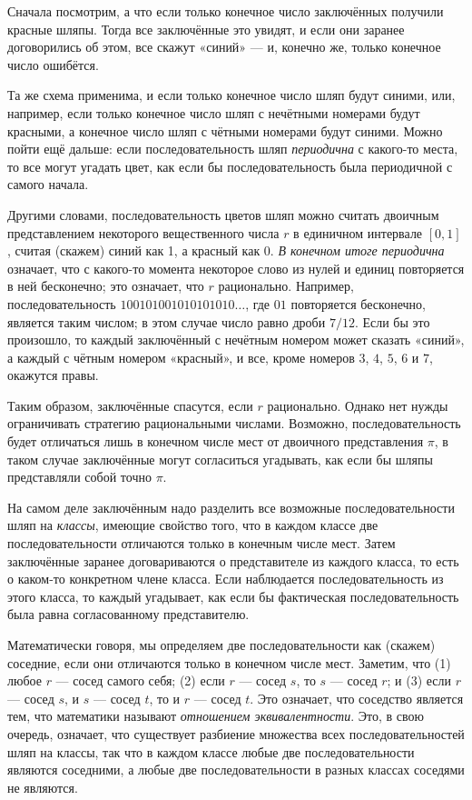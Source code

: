 Сначала посмотрим, а что если только конечное число заключённых получили красные шляпы.
Тогда все заключённые это увидят, и если они заранее договорились об этом, все скажут «синий» --- и, конечно же, только конечное число ошибётся.

Та же схема применима, и если только конечное число шляп будут синими, или, например, если только конечное число шляп с нечётными номерами будут красными, а конечное число шляп с чётными номерами будут синими.
Можно пойти ещё дальше: если последовательность шляп \emph{периодична} с какого-то места, то все могут угадать цвет, как если бы последовательность была периодичной с самого начала.

Другими словами, последовательность цветов шляп можно считать двоичным представлением некоторого вещественного числа $r$ в единичном интервале $[0,1]$, считая (скажем) синий как 1, а красный как 0.
\emph{В конечном итоге периодична} означает, что с какого-то момента некоторое слово из нулей и единиц повторяется в ней бесконечно;
это означает, что $r$ рационально.
Например, последовательность $100101001010101010\dots$, где $01$ повторяется бесконечно, является таким числом; в этом случае число равно дроби $7/12$.
Если бы это произошло, то каждый заключённый с нечётным номером может сказать «синий», а каждый с чётным номером «красный», и все, кроме номеров $3$, $4$, $5$, $6$ и $7$, окажутся правы.

Таким образом, заключённые спасутся, если $r$ рационально.
Однако нет нужды ограничивать стратегию рациональными числами.
Возможно, последовательность будет отличаться лишь в конечном числе мест от двоичного представления $\pi$, в таком случае заключённые могут согласиться угадывать, как если бы шляпы представляли собой точно $\pi$.

На самом деле заключённым надо разделить все возможные последовательности шляп на \emph{классы}, имеющие свойство того, что в каждом классе две последовательности отличаются только в конечным числе мест.
Затем заключённые заранее договариваются о представителе из каждого класса, то есть о каком-то конкретном члене класса.
Если наблюдается последовательность из этого класса, то каждый угадывает, как если бы фактическая последовательность была равна согласованному представителю.

Математически говоря, мы определяем две последовательности как (скажем) соседние, если они отличаются только в конечном числе мест.
Заметим, что
(1) любое $r$ --- сосед самого себя;
(2) если $r$ --- сосед $s$, то $s$ --- сосед $r$; и
(3) если $r$ --- сосед $s$, и $s$ --- сосед $t$, то и $r$ --- сосед $t$.
Это означает, что соседство является тем, что математики называют \emph{отношением эквивалентности}.
Это, в свою очередь, означает, что существует разбиение множества всех последовательностей шляп на классы, так что в каждом классе любые две последовательности являются соседними, а любые две последовательности в разных классах соседями не являются.

